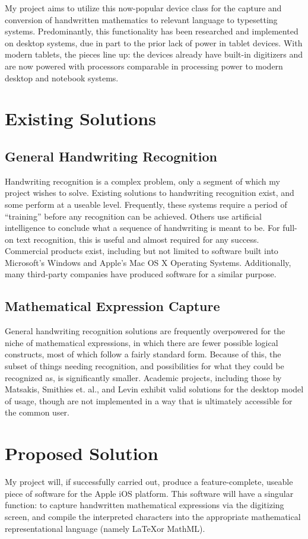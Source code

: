 \documentclass{acm_proc_article-sp}
\begin{document}
My project aims to utilize this now-popular device class for the capture and conversion of handwritten mathematics to relevant language to typesetting systems. Predominantly, this functionality has been researched and implemented on desktop systems, due in part to the prior lack of power in tablet devices. With modern tablets, the pieces line up: the devices already have built-in digitizers and are now powered with processors comparable in processing power to modern desktop and notebook systems.
\section{Existing Solutions}

\subsection{General Handwriting Recognition} 
Handwriting recognition is a complex problem, only a segment of which my project wishes to solve. Existing solutions to handwriting recognition exist, and some  perform at a useable level. Frequently, these systems require a period of ``training'' before any recognition can be achieved. Others use artificial intelligence to conclude what a sequence of handwriting is meant to be. For full-on text recognition, this is useful and almost required for any success. Commercial products exist, including but not limited to software built into Microsoft's Windows and Apple's Mac OS X Operating Systems. Additionally, many third-party companies have produced software for a similar purpose.

\subsection{Mathematical Expression Capture}
General handwriting recognition solutions are frequently overpowered for the niche of mathematical expressions, in which there are fewer possible logical constructs, most of which follow a fairly standard form. Because of this, the subset of things needing recognition, and possibilities for what they could be recognized as, is significantly smaller. Academic projects, including those by Matsakis\cite{matsakis_recognition_1999}, Smithies et. al.\cite{smithies_handwriting-based_1999}, and Levin\cite{levin_cellwriter:_2007} exhibit valid solutions for the desktop model of usage, though are not implemented in a way that is ultimately accessible for the common user.

\section{Proposed Solution}
My project will, if successfully carried out, produce a feature-complete, useable piece of software for the Apple iOS platform. This software will have a singular function: to capture handwritten mathematical expressions via the digitizing screen, and compile the interpreted characters into the appropriate mathematical representational language (namely \LaTeX or MathML). 
\end{document}
